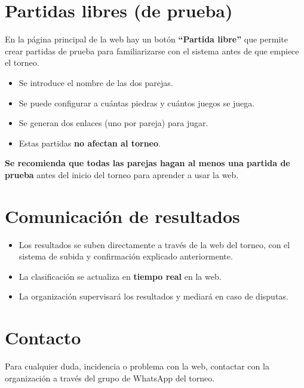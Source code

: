 \documentclass[11pt,a4paper]{article}
\begin{document}
\section{Partidas libres (de prueba)}

En la página principal de la web hay un botón \textbf{``Partida libre''} que permite crear partidas de prueba para familiarizarse con el sistema antes de que empiece el torneo.

\begin{itemize}
    \item Se introduce el nombre de las dos parejas.
    \item Se puede configurar a cuántas piedras y cuántos juegos se juega.
    \item Se generan dos enlaces (uno por pareja) para jugar.
    \item Estas partidas \textbf{no afectan al torneo}.
\end{itemize}

\textbf{Se recomienda que todas las parejas hagan al menos una partida de prueba} antes del inicio del torneo para aprender a usar la web.

\section{Comunicación de resultados}

\begin{itemize}
    \item Los resultados se suben directamente a través de la web del torneo, con el sistema de subida y confirmación explicado anteriormente.
    \item La clasificación se actualiza en \textbf{tiempo real} en la web.
    \item La organización supervisará los resultados y mediará en caso de disputas.
\end{itemize}

\section{Contacto}

Para cualquier duda, incidencia o problema con la web, contactar con la organización a través del grupo de WhatsApp del torneo.
\end{document}
